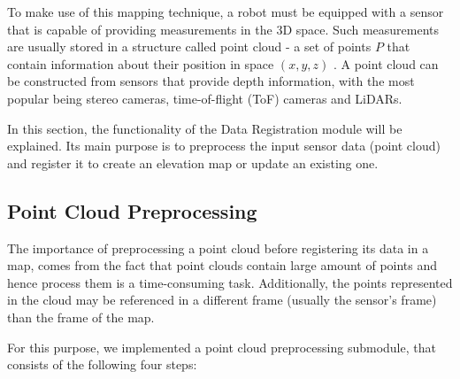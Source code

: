 To make use of this mapping technique, a robot must be equipped with a
sensor that is capable of providing measurements in the 3D space.
Such measurements are usually stored in a structure called point cloud -
a set of points $P$ that contain information about their position in
space $(x,y,z)$ \parencite{Rusu2011}.
A point cloud can be constructed from sensors that provide depth information,
with the most popular being stereo cameras, time-of-flight (ToF) cameras
and LiDARs.

In this section, the functionality of the Data Registration module will be
explained.
Its main purpose is to preprocess the input sensor data (point cloud)
and register it to create an elevation map or update an existing one.

\subsection{Point Cloud Preprocessing} \label{point_cloud_processing}

The importance of preprocessing a point cloud before registering its data
in a map, comes from the fact that point clouds contain large amount of points
and hence process them is a time-consuming task.
Additionally, the points represented in the cloud may be referenced in a
different frame (usually the sensor's frame) than the frame of the map.

For this purpose, we implemented a point cloud preprocessing submodule,
that consists of the following four steps:

